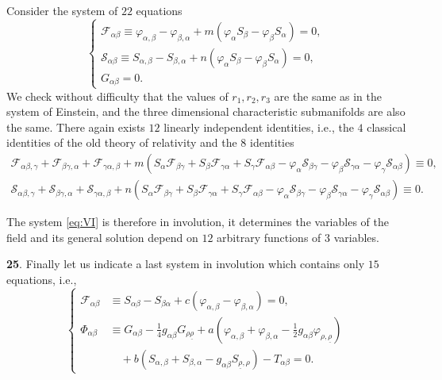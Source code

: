 \documentclass[leqno,11pt]{article}
\theoremstyle{shape1}
\theoremstyle{shape0}
\theoremstyle{shape2}
\theoremstyle{definition}
\begin{document}
Consider the system of $22$ equations
\begin{equation}
  \label{eq:VI}\tag{VI}
  \left\{
    \begin{gathered}
      \mathcal{F}_{\alpha\beta}\equiv\varphi_{\alpha,\beta}-\varphi_{\beta,\alpha}+m(\varphi_{\alpha}S_{\beta}-\varphi_{\beta}S_{\alpha})=0,\\
      \mathcal{S}_{\alpha\beta}\equiv S_{\alpha,\beta}-S_{\beta,\alpha}+n(\varphi_{\alpha}S_{\beta}-\varphi_{\beta}S_{\alpha})=0,\\
G_{\alpha\beta}=0.
    \end{gathered}
  \right.
\end{equation}
We check without difficulty that the values of $r_{1},r_{2},r_{3}$ are the same as in the system of Einstein, and the three dimensional characteristic submanifolds are also the same. There again exists $12$ linearly independent identities, i.e., the $4$ classical identities of the old theory of relativity and the $8$ identities
\begin{align*}
  \mathcal{F}_{\alpha\beta,\gamma}+\mathcal{F}_{\beta\gamma,\alpha}+\mathcal{F}_{\gamma\alpha,\beta}+m(S_{\alpha}\mathcal{F}_{\beta\gamma}+S_{\beta}\mathcal{F}_{\gamma\alpha}+S_{\gamma}\mathcal{F}_{\alpha\beta}-\varphi_{\alpha}\mathcal{S}_{\beta\gamma}-\varphi_{\beta}\mathcal{S}_{\gamma\alpha}-\varphi_{\gamma}\mathcal{S}_{\alpha\beta})\equiv 0,\\
  \mathcal{S}_{\alpha\beta,\gamma}+\mathcal{S}_{\beta\gamma,\alpha}+\mathcal{S}_{\gamma\alpha,\beta}+n(S_{\alpha}\mathcal{F}_{\beta\gamma}+S_{\beta}\mathcal{F}_{\gamma\alpha}+S_{\gamma}\mathcal{F}_{\alpha\beta}-\varphi_{\alpha}\mathcal{S}_{\beta\gamma}-\varphi_{\beta}\mathcal{S}_{\gamma\alpha}-\varphi_{\gamma}\mathcal{S}_{\alpha\beta})\equiv 0.
\end{align*}

The system \eqref{eq:VI} is therefore in involution, it determines the variables of the field and its general solution depend on $12$ arbitrary functions of $3$ variables.

\vspace{12pt}

\textbf{25}. Finally let us indicate a last system in involution which contains only $15$ equations, i.e.,
\begin{equation}
  \label{eq:VII}\tag{VII}
  \left\{
    \begin{aligned}
      \mathcal{F}_{\alpha\beta}&\equiv S_{\alpha\beta}-S_{\beta\alpha}+c(\varphi_{\alpha,\beta}-\varphi_{\beta,\alpha})=0,\\
      \Phi_{\alpha\beta}&\equiv G_{\alpha\beta}-\frac{1}{4}g_{\alpha\beta}G_{\rho\underline\rho}+a\left(\varphi_{\alpha,\beta}+\varphi_{\beta,\alpha}-\frac{1}{2}g_{\alpha\beta}\varphi_{\rho,\underline\rho}\right)\\
      &\quad +b(S_{\alpha,\beta}+S_{\beta,\alpha}-g_{\alpha\beta}S_{\underline\rho,\rho})-T_{\alpha\beta}=0.
    \end{aligned}
  \right.
\end{equation}
\end{document}
